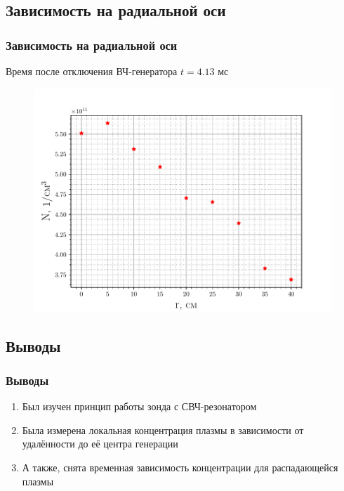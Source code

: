 \documentclass[10pt,pdf,hyperref={unicode}, dvipsnames]{beamer}
\begin{document}
\subsection{Зависимость на радиальной оси}
\begin{frame}
	\frametitle{Зависимость на радиальной оси}
	Время после отключения ВЧ-генератора $t=4.13$ мс
	\begin{figure}[tb]
		\centering
		\includegraphics[width=0.9\linewidth]{fig/radial}
		\label{fig:2}
	\end{figure}
\end{frame}

\subsection{Выводы}
\begin{frame}
		\vfill
		\frametitle{Выводы}
		\begin{enumerate}
			\item Был изучен принцип работы зонда с СВЧ-резонатором
			

			\item Была измерена локальная концентрация плазмы в зависимости 
			от удалённости до её центра генерации

			\item А также, снята временная зависимость концентрации для распадающейся плазмы  

		\end{enumerate}
		\vfill
\end{frame}
\end{document}
